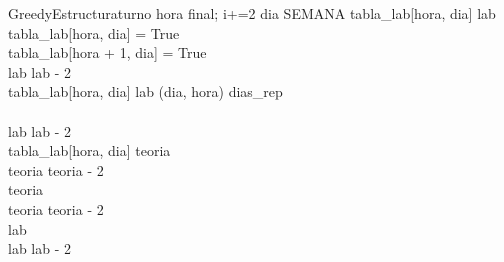\begin{pseudocode}{GreedyEstructura}{turno}
       		\FOR hora  \TO final; i+=2 \DO
       		\BEGIN
       		   \FOR dia \in SEMANA \DO
               \BEGIN
                    \IF \NOT tabla\_lab[hora, dia] \AND lab  \THEN
                    \BEGIN
                        \\
                        tabla\_lab[hora, dia] = True\\
                        tabla\_lab[hora + 1, dia] = True\\
                        lab \GETS lab - 2\\
                    \END
                    \ELSEIF tabla\_lab[hora, dia] \AND lab  \AND (dia, hora) \in dias\_rep \THEN
                    \BEGIN
                        \\
                        \\
                        lab \GETS lab - 2\\
                    \END
                    \ELSEIF tabla\_lab[hora, dia] \AND teoria  \THEN
                    \BEGIN
                        \\
                        teoria \GETS teoria - 2\\
                    \END
                    \ELSEIF teoria  \THEN
                    \BEGIN
                        \\
                        teoria \GETS teoria - 2\\
                    \END
                    \ELSEIF lab  \THEN
                    \BEGIN
                        \\
                        lab \GETS lab - 2\\
                    \END
                    \ELSE {}
               \END
       		\END
       	\END
    \END
\end{pseudocode}
